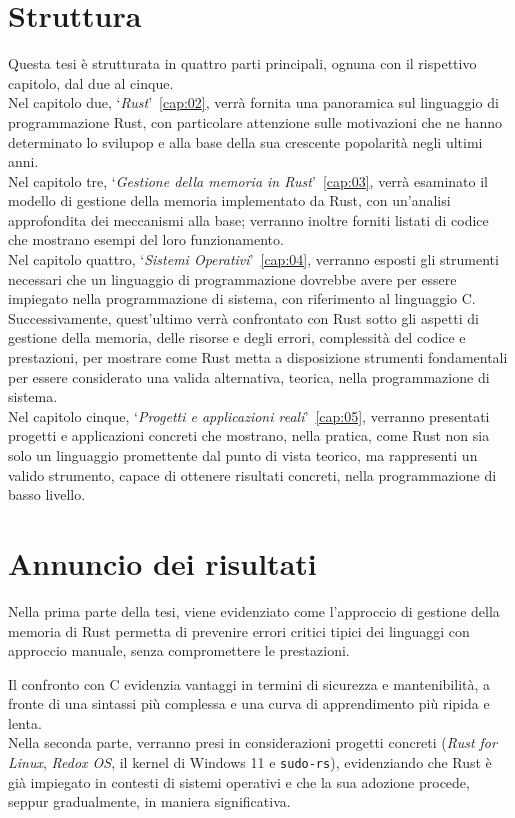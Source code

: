 \section{Struttura} 
Questa tesi è strutturata in quattro parti principali, ognuna con il rispettivo 
capitolo, dal due al cinque. \hfill
\vspace{7pt}\\
\noindent Nel capitolo due, `\textit{Rust}'~\ref{cap:02}, verrà fornita una panoramica sul linguaggio di programmazione Rust, con particolare attenzione sulle motivazioni 
che ne hanno determinato lo svilupop e alla base della sua crescente popolarità negli ultimi anni. \hfill
\vspace{7pt}\\
\noindent Nel capitolo tre, `\textit{Gestione della memoria in Rust}'~\ref{cap:03}, verrà esaminato il modello di gestione della memoria implementato da Rust,
con un'analisi approfondita dei meccanismi alla base; verranno inoltre forniti listati di codice che mostrano esempi del loro funzionamento. \hfill
\vspace{7pt}\\
\noindent Nel capitolo quattro, `\textit{Sistemi Operativi}'~\ref{cap:04}, verranno esposti gli strumenti necessari che un linguaggio di programmazione dovrebbe avere per essere impiegato 
nella programmazione di sistema, con riferimento al linguaggio C. 
Successivamente, quest'ultimo verrà confrontato con Rust sotto gli aspetti di 
gestione della memoria, delle risorse e degli errori, complessità del codice e prestazioni, per mostrare come Rust metta a disposizione strumenti 
fondamentali per essere considerato una valida alternativa, teorica, nella programmazione di sistema. \hfill
\vspace{7pt}\\
\noindent Nel capitolo cinque, `\textit{Progetti e applicazioni reali}'~\ref{cap:05}, verranno presentati progetti e applicazioni concreti che mostrano, nella pratica, come 
Rust non sia solo un linguaggio promettente dal punto di vista teorico, ma rappresenti un valido strumento, capace di ottenere risultati concreti, nella programmazione di basso livello.

\section{Annuncio dei risultati}
Nella prima parte della tesi, viene evidenziato come l'approccio di gestione della memoria di Rust permetta 
di prevenire errori critici tipici dei linguaggi con approccio manuale, senza compromettere le prestazioni.

Il confronto con C evidenzia vantaggi in termini di sicurezza e mantenibilità, a fronte di una sintassi più complessa 
e una curva di apprendimento più ripida e lenta. \hfill 
\vspace{8pt}\\
\noindent Nella seconda parte, verranno presi in considerazioni progetti concreti (\textit{Rust for Linux}, \textit{Redox OS}, il kernel di Windows 11 e \texttt{sudo-rs}), 
evidenziando che Rust è già impiegato in contesti di sistemi operativi e che la sua adozione procede, seppur gradualmente, in maniera significativa. 